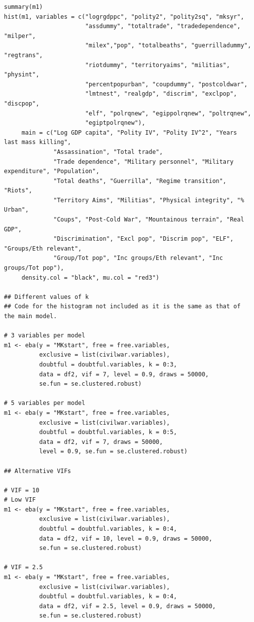 \documentclass[a4paper,12pt]{article}
\begin{document}
\begin{verbatim}
summary(m1)
hist(m1, variables = c("logrgdppc", "polity2", "polity2sq", "mksyr",
                       "assdummy", "totaltrade", "tradedependence", "milper",
                       "milex","pop", "totalbeaths", "guerrilladummy", "regtrans",
                       "riotdummy", "territoryaims", "militias", "physint",
                       "percentpopurban", "coupdummy", "postcoldwar",
                       "lmtnest", "realgdp", "discrim", "exclpop", "discpop",
                       "elf", "polrqnew", "egippolrqnew", "poltrqnew",
                       "egiptpolrqnew"),
     main = c("Log GDP capita", "Polity IV", "Polity IV^2", "Years last mass killing",
              "Assassination", "Total trade", 
              "Trade dependence", "Military personnel", "Military expenditure", "Population", 
              "Total deaths", "Guerrilla", "Regime transition", "Riots",
              "Territory Aims", "Militias", "Physical integrity", "% Urban",
              "Coups", "Post-Cold War", "Mountainous terrain", "Real GDP",
              "Discrimination", "Excl pop", "Discrim pop", "ELF", "Groups/Eth relevant", 
              "Group/Tot pop", "Inc groups/Eth relevant", "Inc groups/Tot pop"),
     density.col = "black", mu.col = "red3")

## Different values of k
## Code for the histogram not included as it is the same as that of the main model.

# 3 variables per model
m1 <- eba(y = "MKstart", free = free.variables,
          exclusive = list(civilwar.variables),
          doubtful = doubtful.variables, k = 0:3,
          data = df2, vif = 7, level = 0.9, draws = 50000,
          se.fun = se.clustered.robust)

# 5 variables per model
m1 <- eba(y = "MKstart", free = free.variables,
          exclusive = list(civilwar.variables),
          doubtful = doubtful.variables, k = 0:5,
          data = df2, vif = 7, draws = 50000,
          level = 0.9, se.fun = se.clustered.robust)
          
## Alternative VIFs

# VIF = 10
# Low VIF
m1 <- eba(y = "MKstart", free = free.variables,
          exclusive = list(civilwar.variables),
          doubtful = doubtful.variables, k = 0:4,
          data = df2, vif = 10, level = 0.9, draws = 50000,
          se.fun = se.clustered.robust)

# VIF = 2.5
m1 <- eba(y = "MKstart", free = free.variables,
          exclusive = list(civilwar.variables),
          doubtful = doubtful.variables, k = 0:4,
          data = df2, vif = 2.5, level = 0.9, draws = 50000,
          se.fun = se.clustered.robust)


\end{verbatim}
\end{document}
